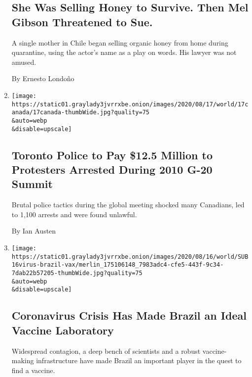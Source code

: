 \begin{enumerate}
  \hypertarget{she-was-selling-honey-to-survive-then-mel-gibson-threatened-to-sue}{%
  \subsection{She Was Selling Honey to Survive. Then Mel Gibson
  Threatened to
  Sue.}\label{she-was-selling-honey-to-survive-then-mel-gibson-threatened-to-sue}}

  A single mother in Chile began selling organic honey from home during
  quarantine, using the actor's name as a play on words. His lawyer was
  not amused.

  By Ernesto Londoño
\item
  \href{/2020/08/17/world/canada/toronto-g20-settlement.html}{}

  \texttt{[image: https://static01.graylady3jvrrxbe.onion/images/2020/08/17/world/17canada/17canada-thumbWide.jpg?quality=75\\\&auto=webp\\\&disable=upscale]}

  \hypertarget{toronto-police-to-pay-125-million-to-protesters-arrested-during-2010-g-20-summit}{%
  \subsection{Toronto Police to Pay \$12.5 Million to Protesters
  Arrested During 2010 G-20
  Summit}\label{toronto-police-to-pay-125-million-to-protesters-arrested-during-2010-g-20-summit}}

  Brutal police tactics during the global meeting shocked many
  Canadians, led to 1,100 arrests and were found unlawful.

  By Ian Austen
\item
  \href{/2020/08/15/world/americas/brazil-coronavirus-vaccine.html}{}

  \texttt{[image: https://static01.graylady3jvrrxbe.onion/images/2020/08/16/world/SUB16virus-brazil-vax/merlin\_175106148\_7983adc4-cfe5-443f-9c34-7dab22b57205-thumbWide.jpg?quality=75\\\&auto=webp\\\&disable=upscale]}

  \hypertarget{coronavirus-crisis-has-made-brazil-an-ideal-vaccine-laboratory}{%
  \subsection{Coronavirus Crisis Has Made Brazil an Ideal Vaccine
  Laboratory}\label{coronavirus-crisis-has-made-brazil-an-ideal-vaccine-laboratory}}

  Widespread contagion, a deep bench of scientists and a robust
  vaccine-making infrastructure have made Brazil an important player in
  the quest to find a vaccine.


\end{enumerate}
